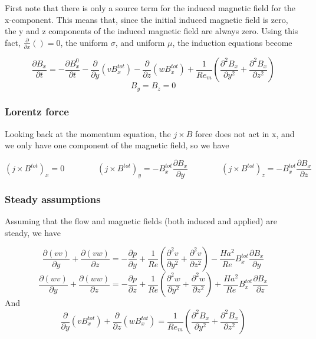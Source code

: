 \documentclass[11pt]{article}
\begin{document}
First note that there is only a source term for the induced magnetic field for the x-component. This means that, since the initial induced magnetic field is zero, the y and z components of the induced magnetic field are always zero. Using this fact, $\frac{\partial}{\partial x} ()=0$, the uniform $\sigma$, and uniform $\mu$, the induction equations become


\begin{equation}
	\frac{\partial B_x}{\partial t}
	=
	- \frac{\partial B_x^0}{\partial t}
	- \frac{\partial}{\partial y} (v B_x^{tot})
	- \frac{\partial}{\partial z} (w B_x^{tot})
	+ \frac{1}{Re_m}
	\left(
	\frac{\partial^2 B_x}{\partial y^2}
	+
	\frac{\partial^2 B_x}{\partial z^2}
	\right)
\end{equation}
\begin{equation}
	B_y = B_z = 0
\end{equation}

\subsubsection{Lorentz force}

Looking back at the momentum equation, the $j\times B$ force does not act in x, and we only have one component of the magnetic field, so we have

\begin{equation}
	(j \times B^{tot})_x = 0
	\qquad \qquad
	(j \times B^{tot})_y = -	B_x^{tot} \frac{\partial B_x}{\partial y}
	\qquad \qquad
	(j \times B^{tot})_z = - B_x^{tot} \frac{\partial B_x}{\partial z}
\end{equation}

\subsubsection{Steady assumptions}
Assuming that the flow and magnetic fields (both induced and applied) are steady, we have

\begin{equation}
	\frac{\partial (v v)}{\partial y}
	+ \frac{\partial (v w)}{\partial z}
	=
	- \frac{\partial p}{\partial y}
	+ \frac{1}{Re}
	\left(
	\frac{\partial^2 v}{\partial y^2}
	+\frac{\partial^2 v}{\partial z^2}
	\right)
	-
	\frac{Ha^2}{Re}
	B_x^{tot}
	\frac{\partial B_x}{\partial y}
\end{equation}
\begin{equation}
	\frac{\partial (w v)}{\partial y}
	+ \frac{\partial (w w)}{\partial z}
	=
	- \frac{\partial p}{\partial z}
	+ \frac{1}{Re}
	\left(
	\frac{\partial^2 w}{\partial y^2}
	+\frac{\partial^2 w}{\partial z^2}
	\right)
	+ \frac{Ha^2}{Re}
	B_x^{tot}
	\frac{\partial B_x}{\partial z}
\end{equation}
And
\begin{equation}
	\frac{\partial}{\partial y} (v B_x^{tot})
	+ \frac{\partial}{\partial z} (w B_x^{tot})
	=
	\frac{1}{Re_m}
	\left(
	\frac{\partial^2 B_x}{\partial y^2}
	+
	\frac{\partial^2 B_x}{\partial z^2}
	\right)
\end{equation}
\end{document}
